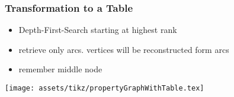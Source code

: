 \begin{frame}
    \frametitle{Transformation to a Table}
    \begin{itemize}
        \item Depth-First-Search starting at highest rank
        \item retrieve only arcs. vertices will be reconstructed form arcs
        \item remember middle node
    \end{itemize}
    \centering
    \texttt{[image: assets/tikz/propertyGraphWithTable.tex]}

\end{frame}